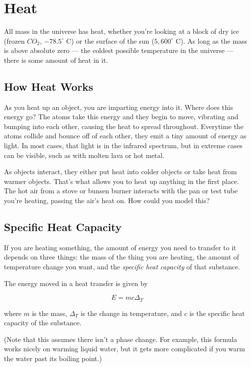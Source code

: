 \chapter{Heat}

All mass in the universe has heat, whether you're looking at a block of dry ice (frozen $CO_2$, $-78.5^\circ$ C)
or the surface of the sun ($5,600^\circ$ C). As long as the mass is above absolute zero --- the coldest possible
temperature in the universe --- there is some amount of heat in it.

\section{How Heat Works}

As you heat up an object, you are imparting energy into it. Where does this energy go? The atoms take this energy
and they begin to move, vibrating and bumping into each other, causing the heat to spread throughout. Everytime the
atoms collide and bounce off of each other, they emit a tiny amount of energy as light. In most cases, that light is
in the infrared spectrum, but in extreme cases can be visible, such as with molten lava or hot metal.

As objects interact, they either put heat into colder objects or take heat from warmer objects. That's what allows you to heat up
anything in the first place. The hot air from a stove or bunsen burner interacts with the pan or test tube you're heating,
passing the air's heat on. How could you model this?

\section{Specific Heat Capacity}

If you are heating something, the amount of energy you need to
transfer to it depends on three things: the mass of the thing you are
heating, the amount of temperature change you want, and the
\textit{specific heat capacity} of that substance.

\begin{mdframed}[style=important, frametitle={Energy in Heat Transfer}]

  The energy moved in a heat transfer is given by

  $$E = m c \Delta_T$$

  where $m$ is the mass, $\Delta_T$ is the change in temperature, and
  $c$ is the specific heat capacity of the substance.

  (Note that this
  assumes there isn't a phase change. For example, this formula works nicely on
  warming liquid water, but it gets more complicated if you warm the
  water past its boiling point.)

\end{mdframed}

